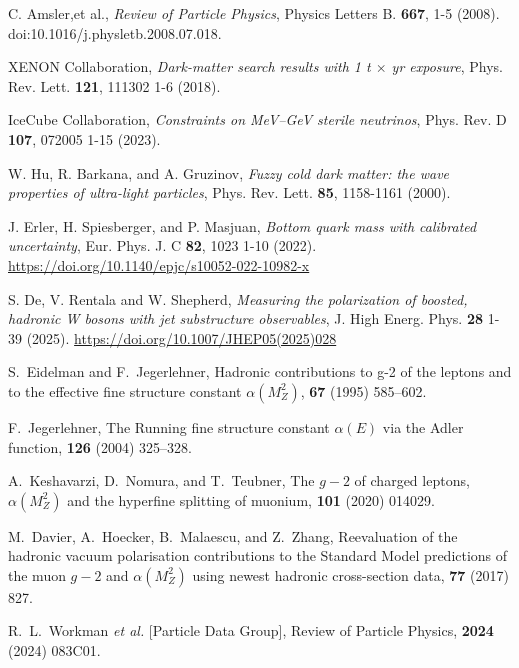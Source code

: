 \documentclass[%
  amsmath,amssymb,
  aps,
 prb,
 floatfix, showkeys
 ]{revtex4-2}
\begin{document}
\begin{thebibliography}{99}
   C. Amsler,et al., {\it Review of Particle Physics},
   Physics Letters B.  {\bf 667}, 1-5 (2008). doi:10.1016/j.physletb.2008.07.018.
 
   XENON Collaboration,  {\it Dark-matter search results with 1 t $\times$ yr exposure},
   Phys. Rev. Lett. {\bf 121}, 111302 1-6  (2018).
   
   IceCube Collaboration, {\it Constraints on MeV–GeV sterile neutrinos},
   Phys. Rev. D  {\bf 107}, 072005 1-15 (2023).
 
   W. Hu, R. Barkana,  and A. Gruzinov,
   {\it Fuzzy cold dark matter: the wave properties of ultra-light particles},
   Phys. Rev. Lett. {\bf 85}, 1158-1161  (2000).
 
   J. Erler, H. Spiesberger, and P.  Masjuan,
   {\it Bottom quark mass with calibrated uncertainty},
   Eur. Phys. J. C  {\bf 82}, 1023 1-10 (2022). \url{https://doi.org/10.1140/epjc/s10052-022-10982-x}
 
   S. De, V. Rentala and W. Shepherd,
   {\it Measuring the polarization of boosted, hadronic W bosons with jet substructure observables},
    J. High Energ. Phys. {\bf  28} 1-39 (2025). \url{https://doi.org/10.1007/JHEP05(2025)028}
   
 S.~Eidelman and F.~Jegerlehner,
 \newblock Hadronic contributions to g-2 of the leptons and to the effective fine structure constant $\alpha(M_Z^2)$,
  {\bf 67} (1995) 585--602.
 
 F.~Jegerlehner,
 \newblock The Running fine structure constant $\alpha(E)$ via the Adler function,
  {\bf 126} (2004) 325--328.
 
 A.~Keshavarzi, D.~Nomura, and T.~Teubner,
 \newblock The $g{-}2$ of charged leptons, $\alpha(M_Z^2)$ and the hyperfine splitting of muonium,
  {\bf 101} (2020) 014029.
 
 M.~Davier, A.~Hoecker, B.~Malaescu, and Z.~Zhang,
 \newblock Reevaluation of the hadronic vacuum polarisation contributions to the Standard Model predictions of the muon $g{-}2$ and $\alpha(M_Z^2)$ using newest hadronic cross-section data,
  {\bf 77} (2017) 827.
 
 R.~L.~Workman {\em et al.} [Particle Data Group],
 \newblock Review of Particle Physics,
  {\bf 2024} (2024) 083C01.
 

\end{thebibliography}
\end{document}
